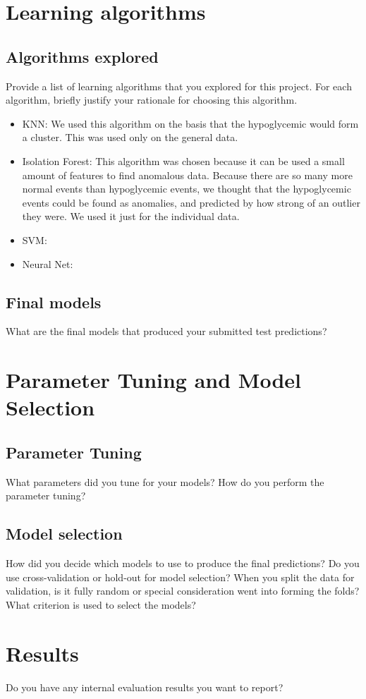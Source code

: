 \documentclass[11pt,a4paper]{article}
\begin{document}
\section{Learning algorithms}
\subsection{Algorithms explored}
Provide a list of learning algorithms that you explored for this project. For each algorithm, briefly justify your rationale for choosing this algorithm.\\
\begin{itemize}
  \item KNN: We used this algorithm on the basis that the hypoglycemic would form a cluster.
  This was used only on the general data.
  \item Isolation Forest: This algorithm was chosen because it can be used a small amount of features to find anomalous data.
  Because there are so many more normal events than hypoglycemic events, we thought that the hypoglycemic events could be found as anomalies, and predicted by how strong of an outlier they were.  We used it just for the individual data.
  \item SVM:
  \item Neural Net:
\end{itemize}

\subsection{Final models}
What are the final models that produced your submitted test predictions?\\

\section{Parameter Tuning and Model Selection }
\subsection{Parameter Tuning}
What parameters did you tune for your models? How do you perform the parameter tuning?\\


\subsection{Model selection}
How did you decide which models to use to produce the final predictions?  Do you use cross-validation or hold-out for model selection? When you split the data for validation, is it fully random or special consideration went into forming the folds? What criterion is used to select the models?\\


\section{Results}
Do you have any internal evaluation results you want to report?\\
\end{document}
